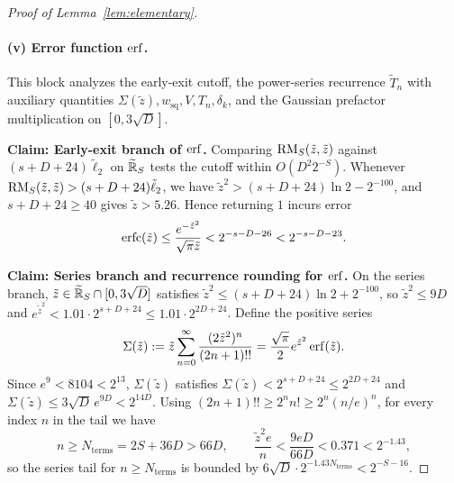 \begin{proof}[Proof of Lemma~\ref{lem:elementary}]
\paragraph{(v) Error function $\operatorname{erf}$.}
This block analyzes the early-exit cutoff, the power-series recurrence $\tilde{T}_n$ with auxiliary quantities $\Sigma(\tilde{z}), w_{\mathrm{sq}}, V, T_n, \delta_k$, and the Gaussian prefactor multiplication on $[0, 3\sqrt{D}]$.

\textbf{Claim: Early-exit branch of $\operatorname{erf}$.}
Comparing $\operatorname{RM}_S(\tilde{z}, \tilde{z})$ against $(s + D + 24)\tilde{\ell}_2$ on $\widetilde{\mathbb{R}}_S$ tests the cutoff within $O(D^2 2^{-S})$. Whenever $\operatorname{RM}_S(\tilde{z}, \tilde{z}) > (s + D + 24)\tilde{\ell}_2$, we have $\tilde{z}^2 > (s + D + 24)\ln 2 - 2^{-100}$, and $s + D + 24 \ge 40$ gives $\tilde{z} > 5.26$. Hence returning $1$ incurs error
\[
  \operatorname{erfc}(\tilde{z}) \le \frac{e^{-\tilde{z}^2}}{\sqrt{\pi}\tilde{z}} < 2^{-s-D-26} < 2^{-s-D-23}.
\]

\textbf{Claim: Series branch and recurrence rounding for $\operatorname{erf}$.}
On the series branch, $\tilde{z} \in \widetilde{\mathbb{R}}_S \cap [0, 3\sqrt{D}]$ satisfies $\tilde{z}^2 \le (s + D + 24)\ln 2 + 2^{-100}$, so $\tilde{z}^2 \le 9D$ and $e^{\tilde{z}^2} < 1.01 \cdot 2^{s+D+24} \le 1.01 \cdot 2^{2D+24}$. Define the positive series
\[
  \Sigma(\tilde{z}) := \tilde{z} \sum_{n=0}^\infty \frac{(2\tilde{z}^2)^n}{(2n+1)!!} = \frac{\sqrt{\pi}}{2} e^{\tilde{z}^2}\operatorname{erf}(\tilde{z}).
\]
Since $e^9 < 8104 < 2^{13}$, $\Sigma(\tilde{z})$ satisfies $\Sigma(\tilde{z}) < 2^{s+D+24} \le 2^{2D+24}$ and $\Sigma(\tilde{z}) \le 3\sqrt{D}\,e^{9D} < 2^{14D}$. Using $(2n+1)!! \ge 2^n n! \ge 2^n (n/e)^n$, for every index $n$ in the tail we have
\[
  n \ge N_{\mathrm{terms}} = 2S + 36D > 66D, \qquad \frac{\tilde{z}^2 e}{n} < \frac{9eD}{66D} < 0.371 < 2^{-1.43},
\]
so the series tail for $n \ge N_{\mathrm{terms}}$ is bounded by $6\sqrt{D} \cdot 2^{-1.43 N_{\mathrm{terms}}} < 2^{-S-16}$.


\end{proof}
